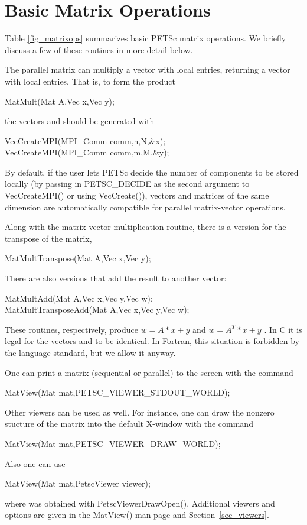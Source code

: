 \section{Basic Matrix Operations}
\label{sec_matoptions}

Table \ref{fig_matrixops} summarizes basic PETSc matrix operations.
We briefly discuss a few of these routines in more detail below.

The parallel matrix can multiply a vector with 
local entries, returning a vector with  local entries. That is,
to form the product
\begin{tabbing}
  MatMult(Mat A,Vec x,Vec y);
\end{tabbing}
the vectors  and  should be generated with
\begin{tabbing}
  VecCreateMPI(MPI\_Comm comm,n,N,\&x);\\
  VecCreateMPI(MPI\_Comm comm,m,M,\&y);
\end{tabbing}
By default, if the user lets PETSc decide the number of components to
be stored locally (by passing in PETSC\_DECIDE as the second
argument to VecCreateMPI() or using VecCreate()), vectors
and matrices of the same dimension are automatically compatible for
parallel matrix-vector operations.

Along with the matrix-vector multiplication routine, there is
a version for the transpose of the matrix,
\begin{tabbing}
  MatMultTranspose(Mat A,Vec x,Vec y);
\end{tabbing}
There are also versions that add the result
to another vector:
\begin{tabbing}
  MatMultAdd(Mat A,Vec x,Vec y,Vec w);\\
  MatMultTransposeAdd(Mat A,Vec x,Vec y,Vec w);
\end{tabbing}
These routines, respectively, produce $ w = A*x + y $ and $ w = A^{T}*x + y$ .
In C it is legal for the vectors  and  to be identical.
In Fortran, this situation is forbidden by the language standard,
but we allow it anyway.

One can print a matrix (sequential or parallel) to the screen with the
command
\begin{tabbing}
  MatView(Mat mat,PETSC\_VIEWER\_STDOUT\_WORLD);
\end{tabbing}
Other viewers can be used as well. For instance, one can draw the
nonzero stucture of the matrix into the default X-window with the
command
\begin{tabbing}
  MatView(Mat mat,PETSC\_VIEWER\_DRAW\_WORLD);
\end{tabbing}
Also one can use
\begin{tabbing}
  MatView(Mat mat,PetscViewer viewer);
\end{tabbing}
where  was obtained with PetscViewerDrawOpen().
Additional viewers and options are given in the MatView() man
page and Section~\ref{sec_viewers}.

